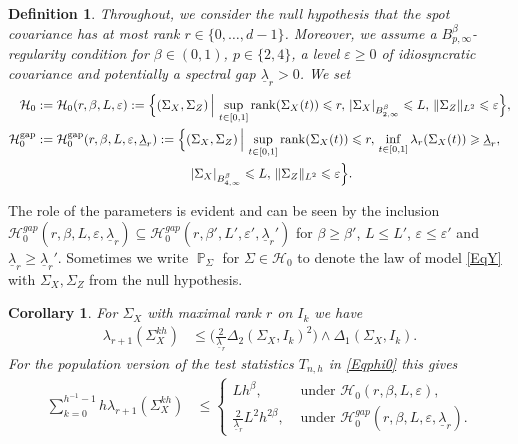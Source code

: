 \documentclass[preprint,aos]{imsart}
\numberwithin{equation}{section}
\newtheorem{corollary}[satz]{Corollary}
\newtheorem{definition}[satz]{Definition}
\theoremstyle{remark}
\DeclareMathOperator{\PP}{{\mathbb P}}
\providecommand{\eps}{\varepsilon}
\renewcommand{\subset}{\subseteq}
\providecommand{\abs}[1]{\lvert #1 \rvert}
\providecommand{\norm}[1]{\lVert #1 \rVert}
\renewcommand{\le}{\leqslant}
\renewcommand{\ge}{\geqslant}
\begin{document}
\begin{definition}\label{DefH0H1}
Throughout, we consider the null hypothesis  that the spot covariance has at most rank $r\in\{0,\ldots,d-1\}$. Moreover, we assume a $B^\beta_{p,\infty}$-regularity condition for $\beta\in(0,1)$, $p\in\{2,4\}$, a level $\eps\ge 0$ of idiosyncratic covariance and potentially a spectral gap $\underline\lambda_r> 0$. We set
\begin{align*}
{\mathcal H}_0&:={\mathcal H}_0(r,\beta,L,\eps):=\Big\{(\Sigma_X,\Sigma_Z)\,\Big|\,\sup_{t\in[0,1]}\rank(\Sigma_X(t))\le r,\,\abs{\Sigma_X}_{B^\beta_{2,\infty}}\le L,\,\norm{\Sigma_Z}_{L^2}\le\eps\Big\},\\
{\mathcal H}_0^{\text{gap}}&:={\mathcal H}_0^{\text{gap}}(r,\beta,L,\eps,\underline\lambda_{r}):=\Big\{(\Sigma_X,\Sigma_Z) \,\Big|\,\sup_{t\in[0,1]}\rank(\Sigma_X(t))\le r,\,\inf_{t\in[0,1]}\lambda_r(\Sigma_X(t))\ge\underline\lambda_r,\\
&\qquad\qquad\qquad\qquad\qquad\qquad \,\abs{\Sigma_X}_{B^\beta_{4,\infty}}\le L,\,\norm{\Sigma_Z}_{L^2}\le \eps\Big\}.
\end{align*}

\end{definition}

The role of the parameters is evident and can be seen by the inclusion ${\mathcal H}_0^{gap}(r,\beta,L,\eps,\underline\lambda_{r})\subset {\mathcal H}_0^{gap}(r,\beta',L',\eps',\underline\lambda_r')$ for $\beta\ge\beta'$, $L\le L'$, $\eps\le\eps'$ and $\underline\lambda_r\ge\underline\lambda_r'$.
Sometimes we write $\PP_\Sigma$ for $\Sigma\in{\mathcal H}_0$ to denote the law of model \eqref{EqY} with $\Sigma_X,\Sigma_Z$ from the null hypothesis.


\begin{corollary} \label{CorBias0}
For $\Sigma_X$ with maximal rank $r$ on $I_k$ we have
\begin{align*}
\lambda_{r+1}(\Sigma_X^{kh})&\le \big(\tfrac{2}{\underline\lambda_r}\Delta_2(\Sigma_X,I_k)^2\big)\wedge \Delta_1(\Sigma_X,I_k).
\end{align*}
For the population version of the test statistics $T_{n,h}$ in \eqref{Eqphi0} this gives
\begin{align*}
\sum_{k=0}^{h^{-1}-1}h\lambda_{r+1}(\Sigma_X^{kh})&\le \begin{cases} Lh^\beta,&\text{ under } {\mathcal H}_0(r,\beta,L,\eps),\\ \frac{2}{\underline\lambda_r}L^2h^{2\beta},& \text{ under } {\mathcal H}_0^{gap}(r,\beta,L,\eps,\underline\lambda_r).\end{cases}
\end{align*}
\end{corollary}
\end{document}
